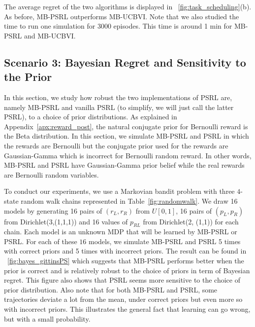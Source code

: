 \begin{subappendices}
The average regret of the two algorithms is displayed in \figurename~\ref{fig:task_scheduling}(b). As before, MB-PSRL outperforms MB-UCBVI.  Note that we also studied the time to run one simulation for 3000 episodes. This time is around 1 min for MB-PSRL and MB-UCBVI. 

\subsection{Scenario 3: Bayesian Regret and Sensitivity to the Prior}
\label{ssec:prior}

In this section, we study how robust the two implementations of PSRL are, namely MB-PSRL and vanilla PSRL (to simplify, we will just call the latter PSRL), to a choice of prior distributions. 
As explained in Appendix~\ref{apx:reward_post}, the natural conjugate prior for Bernoulli reward is the Beta distribution. 
In this section, we simulate MB-PSRL and PSRL in which the rewards are Bernoulli but the conjugate prior used for the rewards are Gaussian-Gamma which is incorrect for Bernoulli random reward. 
In other words, MB-PSRL and PSRL have Gaussian-Gamma prior belief while the real rewards are Bernoulli random variables. 


To conduct our experiments, we use a Markovian bandit problem with three $4$-state random walk chains represented in Table~\ref{fig:randomwalk}. 
We draw 16 models by generating 16 pairs of $(r_L, r_R)$ from $U[0,1]$, 16 pairs of $(p_L, p_R)$ from Dirichlet(3,(1,1,1)) and 16 values of $p_{RL}$ from Dirichlet(2, (1,1)) for each chain. 
Each model is an unknown MDP that will be learned by MB-PSRL or PSRL. 
For each of these $16$ models, we simulate MB-PSRL and PSRL 5 times with correct priors and 5 times with incorrect priors. 
The result can be found in \figurename~\ref{fig:bayes_gittinsPS} which suggests that MB-PSRL performs better when the prior is correct and is relatively robust to the choice of priors in term of Bayesian regret. 
This figure also shows that PSRL seems more sensitive to the choice of prior distribution. 
Also note that for both MB-PSRL and PSRL, some trajectories deviate a lot from the mean, under correct priors but even more so with  incorrect priors. 
This illustrates the general fact that learning can go wrong, but with a small probability.


\end{subappendices}
